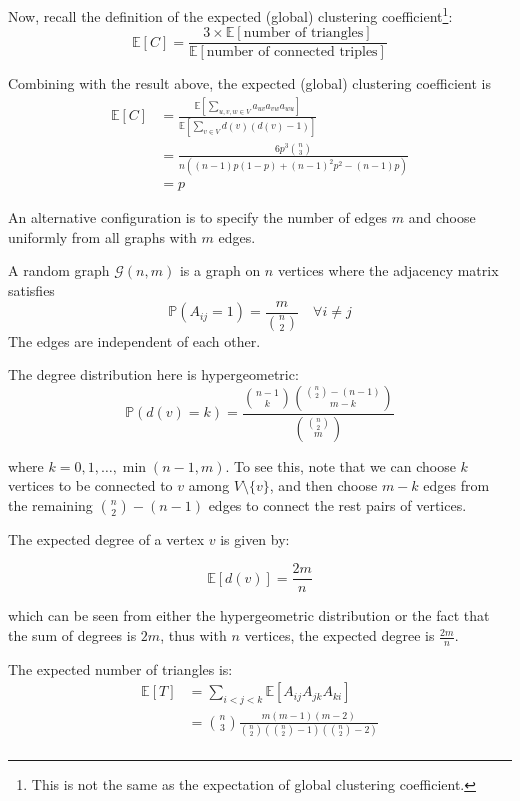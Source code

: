 \documentclass{article}
\begin{document}
Now, recall the definition of the expected (global) clustering coefficient\footnote{This is not the same as the expectation of global clustering coefficient.}:
\begin{equation*}
    \mathbb{E}[C] = \frac{3 \times \mathbb{E}[\text{number of triangles}]}{\mathbb{E}[\text{number of connected triples}]}
\end{equation*}

Combining with the result above, the expected (global) clustering coefficient is
\begin{align*}
    \mathbb{E}[C]&=\frac{\mathbb{E}[\sum_{u,v,w \in V} a_{uv}a_{vw}a_{wu}]}{\mathbb{E}[\sum_{v\in V} d(v)(d(v)-1)]} \\
    &= \frac{6p^3 \binom{n}{3}}{n ((n-1)p(1-p) + (n-1)^2p^2 -(n-1)p)}\\
    &=p
\end{align*}


An alternative configuration is to specify the number of edges $m$ and choose uniformly from all graphs with $m$ edges. 

\begin{definition}
    A random graph $\mathcal{G}(n,m)$ is a graph on $n$ vertices where the adjacency matrix satisfies
    \begin{equation*}
        \mathbb{P}(A_{ij}=1)=\frac{m}{\binom{n}{2}} \quad \forall i \neq j
    \end{equation*}
    The edges are independent of each other.
\end{definition}

The degree distribution here is hypergeometric:
\[
\mathbb{P}(d(v)=k)=\frac{\binom{n-1}{k}\binom{\binom{n}{2}-(n-1)}{m-k}}{\binom{\binom{n}{2}}{m}}
\]

where $k=0,1,\ldots,\min(n-1,m)$. To see this, note that we can choose $k$ vertices to be connected to $v$ among $V\setminus \{v\}$, and then choose $m-k$ edges from the remaining $\binom{n}{2}-(n-1)$ edges to connect the rest pairs of vertices.  

The expected degree of a vertex $v$ is given by:

\[
  \mathbb{E}[d(v)] = \frac{2m}{n}  
\]

which can be seen from either the hypergeometric distribution or the fact that the sum of degrees is $2m$, thus with $n$ vertices, the expected degree is $\frac{2m}{n}$.  

The expected number of triangles is:
\begin{align*}
    \mathbb{E}[T]&=\sum_{i<j<k} \mathbb{E}[A_{ij}A_{jk}A_{ki}]\\
    &=\binom{n}{3}\frac{m(m-1)(m-2)}{\binom{n}{2}\left(\binom{n}{2}-1\right)\left(\binom{n}{2}-2\right)}\\
\end{align*}
\end{document}
